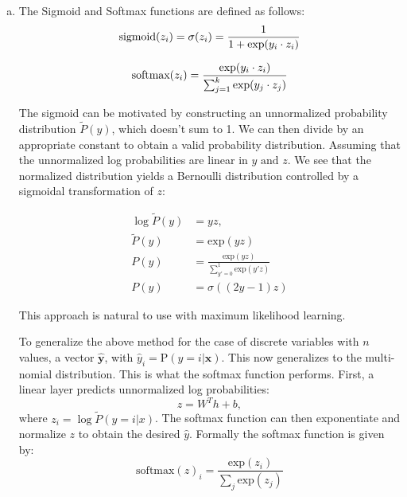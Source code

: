 \documentclass[fleqn]{article}
\begin{document}
\begin{enumerate}[a)]
    \item 
    The Sigmoid and Softmax functions are defined as follows:
    \begin{equation*}
            \text{sigmoid}(z_i) = \sigma(z_i)= \frac{1}{1 + \text{exp}(y_i \cdot z_i)}\\
    \end{equation*}

    \begin{equation*}
            \text{softmax}(z_i) = \frac{\text{exp}(y_i \cdot z_i)}{\sum_{j=1}^k \text{exp}(y_j \cdot z_j)}\\
    \end{equation*}
    
    The sigmoid can be motivated by constructing an unnormalized probability distribution $\tilde{P}(y)$, which 
    doesn't sum to 1. We can then divide by an appropriate constant to obtain a valid probability distribution. 
    Assuming that the unnormalized log probabilities are linear in $y \text{ and } z$. We see that the normalized 
    distribution yields a Bernoulli distribution controlled by a sigmoidal transformation of $z$:
    
    \begin{equation*}
    	\begin{split}
		\log\tilde{P}(y) &= yz,\\
		\tilde{P}(y) &= \text{exp}(yz)\\
		P(y) &= \frac{\text{exp}(yz)}{\sum_{y'=0}^1 \text{exp}(y'z)}\\
		P(y) &= \sigma((2y-1)z)
	\end{split}
    \end{equation*}
    
    This approach is natural to use with maximum likelihood learning. 
    
    To generalize the above method for the case of discrete variables with $n$ values, a vector $\bm{\hat{y}}$, 
    with $\hat{y}_i = \text{P}\left(y = i | \bm{x}\right)$. This now generalizes to the multi-nomial distribution. This is 
    what the softmax function performs.
    First, a linear layer predicts unnormalized log probabilities:
    $$z = W^Th + b,$$
    where $z_i = \log{}\tilde{P}(y=i | x)$. The softmax function can then exponentiate and normalize $z$ to obtain 
    the desired $\hat{y}$. Formally the softmax function is given by:
    $$
    \text{softmax}(z)_i = \frac{\text{exp} (z_i)}{\sum_j \text{exp}(z_j)}
    $$
    

\end{enumerate}
\end{document}
